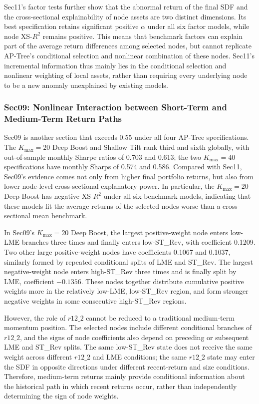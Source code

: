 \documentclass[12pt]{article}
\begin{document}
Sec11's factor tests further show that the abnormal return of the final SDF and the cross-sectional explainability of node assets are two distinct dimensions. Its best specification retains significant positive \(\alpha\) under all six factor models, while node XS-\(R^2\) remains positive. This means that benchmark factors can explain part of the average return differences among selected nodes, but cannot replicate AP-Tree's conditional selection and nonlinear combination of these nodes. Sec11's incremental information thus mainly lies in the conditional selection and nonlinear weighting of local assets, rather than requiring every underlying node to be a new anomaly unexplained by existing models.

\subsubsection{Sec09: Nonlinear Interaction between Short-Term and Medium-Term Return Paths}

Sec09 is another section that exceeds 0.55 under all four AP-Tree specifications. The \(K_{\max}=20\) Deep Boost and Shallow Tilt rank third and sixth globally, with out-of-sample monthly Sharpe ratios of 0.703 and 0.613; the two \(K_{\max}=40\) specifications have monthly Sharps of 0.574 and 0.586. Compared with Sec11, Sec09's evidence comes not only from higher final portfolio returns, but also from lower node-level cross-sectional explanatory power. In particular, the \(K_{\max}=20\) Deep Boost has negative XS-\(R^2\) under all six benchmark models, indicating that these models fit the average returns of the selected nodes worse than a cross-sectional mean benchmark.

In Sec09's \(K_{\max}=20\) Deep Boost, the largest positive-weight node enters low-LME branches three times and finally enters low-ST\_Rev, with coefficient 0.1209. Two other large positive-weight nodes have coefficients 0.1067 and 0.1037, similarly formed by repeated conditional splits of LME and ST\_Rev. The largest negative-weight node enters high-ST\_Rev three times and is finally split by LME, coefficient \(-0.1356\). These nodes together distribute cumulative positive weights more in the relatively low-LME, low-ST\_Rev region, and form stronger negative weights in some consecutive high-ST\_Rev regions.

However, the role of \(r12\_2\) cannot be reduced to a traditional medium-term momentum position. The selected nodes include different conditional branches of \(r12\_2\), and the signs of node coefficients also depend on preceding or subsequent LME and ST\_Rev splits. The same low-ST\_Rev state does not receive the same weight across different \(r12\_2\) and LME conditions; the same \(r12\_2\) state may enter the SDF in opposite directions under different recent-return and size conditions. Therefore, medium-term returns mainly provide conditional information about the historical path in which recent returns occur, rather than independently determining the sign of node weights.
\end{document}
